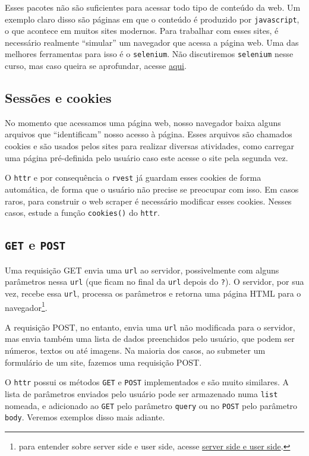 \documentclass[]{book}
\let\rmarkdownfootnote\footnote%
\def\footnote{\protect\rmarkdownfootnote}
\begin{document}
Esses pacotes não são suficientes para acessar todo tipo de conteúdo da
web. Um exemplo claro disso são páginas em que o conteúdo é produzido
por \texttt{javascript}, o que acontece em muitos sites modernos. Para
trabalhar com esses sites, é necessário realmente ``simular'' um
navegador que acessa a página web. Uma das melhores ferramentas para
isso é o \texttt{selenium}. Não discutiremos \texttt{selenium} nesse
curso, mas caso queira se aprofundar, acesse
\href{http://www.seleniumhq.org/}{aqui}.

\subsection{Sessões e cookies}\label{sessoes-e-cookies}

No momento que acessamos uma página web, nosso navegador baixa alguns
arquivos que ``identificam'' nosso acesso à página. Esses arquivos são
chamados cookies e são usados pelos sites para realizar diversas
atividades, como carregar uma página pré-definida pelo usuário caso este
acesse o site pela segunda vez.

O \texttt{httr} e por consequência o \texttt{rvest} já guardam esses
cookies de forma automática, de forma que o usuário não precise se
preocupar com isso. Em casos raros, para construir o web scraper é
necessário modificar esses cookies. Nesses casos, estude a função
\texttt{cookies()} do \texttt{httr}.

\subsection{\texorpdfstring{\texttt{GET} e
\texttt{POST}}{GET e POST}}\label{get-e-post}

Uma requisição GET envia uma \texttt{url} ao servidor, possivelmente com
alguns parâmetros nessa \texttt{url} (que ficam no final da \texttt{url}
depois do \texttt{?}). O servidor, por sua vez, recebe essa
\texttt{url}, processa os parâmetros e retorna uma página HTML para o
navegador\footnote{para entender sobre server side e user side, acesse
  \href{http://programmers.stackexchange.com/a/171210}{server side e
  user side}.}.

A requisição POST, no entanto, envia uma \texttt{url} não modificada
para o servidor, mas envia também uma lista de dados preenchidos pelo
usuário, que podem ser números, textos ou até imagens. Na maioria dos
casos, ao submeter um formulário de um site, fazemos uma requisição
POST.

O \texttt{httr} possui os métodos \texttt{GET} e \texttt{POST}
implementados e são muito similares. A lista de parâmetros enviados pelo
usuário pode ser armazenado numa \texttt{list} nomeada, e adicionado ao
\texttt{GET} pelo parâmetro \texttt{query} ou no \texttt{POST} pelo
parâmetro \texttt{body}. Veremos exemplos disso mais adiante.
\end{document}
